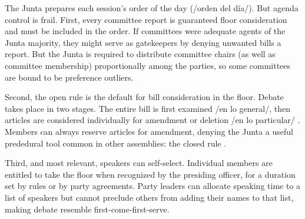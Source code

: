 The Junta prepares each session's order of the day (/orden del día/). But agenda control is frail. First, every committee report is guaranteed floor consideration and must be included in the order. If committees were adequate agents of the Junta majority, they might serve as gatekeepers by denying unwanted bills a report. But the Junta is required to distribute committee chairs (as well as committee membership) proportionally among the parties, so some committees are bound to be preference outliers.

Second, the open rule is the default for bill consideration in the floor. Debate takes place in two stages. The entire bill is first examined /en lo general/, then articles are considered individually for amendment or deletion /en lo particular/ \citep[see][]{heller.weldon.nd}. Members can always reserve articles for amendment, denying the Junta a useful prededural tool common in other assemblies: the closed rule \citep[eg.,][]{cox.2006,weingast.1992,diermeier.feddersen.1998,magar-palanza-sin-Pdt-fast-track-chile-2021jop}.

Third, and most relevant, speakers can self-select. Individual members are entitled to take the floor when recognized by the presiding officer, for a duration set by rules or by party agreements. Party leaders can allocate speaking time to a list of speakers but cannot preclude others from adding their names to that list, making debate resemble first-come-first-serve. 



